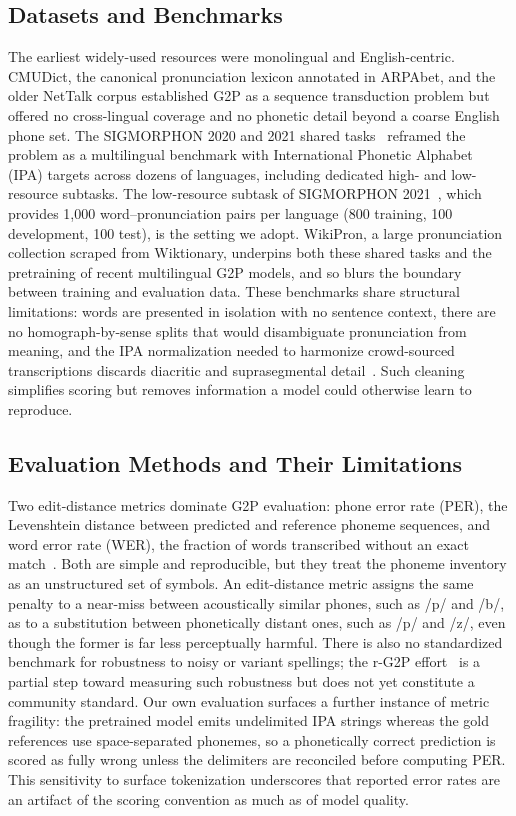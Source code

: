 \documentclass[conference]{IEEEtran}
\begin{document}
\subsection{Datasets and Benchmarks}
The earliest widely-used resources were monolingual and English-centric. CMUDict, the canonical pronunciation lexicon annotated in ARPAbet, and the older NetTalk corpus established G2P as a sequence transduction problem but offered no cross-lingual coverage and no phonetic detail beyond a coarse English phone set. The SIGMORPHON 2020 and 2021 shared tasks~\cite{gorman2020,ashby2021} reframed the problem as a multilingual benchmark with International Phonetic Alphabet (IPA) targets across dozens of languages, including dedicated high- and low-resource subtasks. The low-resource subtask of SIGMORPHON 2021~\cite{ashby2021}, which provides 1{,}000 word--pronunciation pairs per language (800 training, 100 development, 100 test), is the setting we adopt. WikiPron, a large pronunciation collection scraped from Wiktionary, underpins both these shared tasks and the pretraining of recent multilingual G2P models, and so blurs the boundary between training and evaluation data. These benchmarks share structural limitations: words are presented in isolation with no sentence context, there are no homograph-by-sense splits that would disambiguate pronunciation from meaning, and the IPA normalization needed to harmonize crowd-sourced transcriptions discards diacritic and suprasegmental detail~\cite{route2019}. Such cleaning simplifies scoring but removes information a model could otherwise learn to reproduce.

\subsection{Evaluation Methods and Their Limitations}
Two edit-distance metrics dominate G2P evaluation: phone error rate (PER), the Levenshtein distance between predicted and reference phoneme sequences, and word error rate (WER), the fraction of words transcribed without an exact match~\cite{gorman2020}. Both are simple and reproducible, but they treat the phoneme inventory as an unstructured set of symbols. An edit-distance metric assigns the same penalty to a near-miss between acoustically similar phones, such as /p/ and /b/, as to a substitution between phonetically distant ones, such as /p/ and /z/, even though the former is far less perceptually harmful. There is also no standardized benchmark for robustness to noisy or variant spellings; the r-G2P effort~\cite{zhao2022} is a partial step toward measuring such robustness but does not yet constitute a community standard. Our own evaluation surfaces a further instance of metric fragility: the pretrained model emits undelimited IPA strings whereas the gold references use space-separated phonemes, so a phonetically correct prediction is scored as fully wrong unless the delimiters are reconciled before computing PER. This sensitivity to surface tokenization underscores that reported error rates are an artifact of the scoring convention as much as of model quality.
\end{document}
